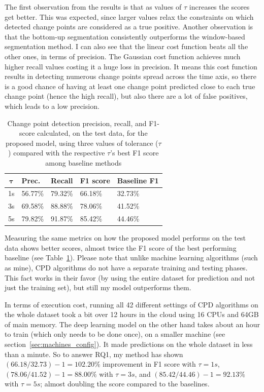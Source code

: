 The first observation from the results is that as values of $\tau$ increases the scores get better. This was expected, since larger values relax the constraints on which detected change points are considered as a true positive. Another observation is that the bottom-up segmentation consistently outperforms the window-based segmentation method. I can also see that the linear cost function beats all the other ones, in terms of precision. The Gaussian cost function achieves much higher recall values costing it a huge loss in precision. It means this cost function results in detecting numerous change points spread across the time axis, so there is a good chance of having at least one change point predicted close to each true change point (hence the high recall), but also there are a lot of false positives, which leads to a low precision. 

\begin{table}
\caption{Change point detection precision, recall, and F1-score calculated, on the test data, for the proposed model, using three values of tolerance ($\tau$) compared with the respective $\tau$'s best F1 score among baseline methods}
\label{tab:rq1-2-results}
\begin{tabularx}{\columnwidth}{cXXXX}
\toprule
  $\mathbf{\tau}$ &
  \textbf{Prec.} &
  \textbf{Recall} &
  \textbf{F1 score} & 
  \textbf{Baseline F1}  \\ \midrule
1s & 56.77\% &	79.32\% &	66.18\% & 32.73\% \\
3s & 69.58\% &	88.88\% &	78.06\% & 41.52\% \\
5s & 79.82\% &	91.87\%	&   85.42\% & 44.46\% \\\bottomrule
\end{tabularx}
\end{table}

Measuring the same metrics on how the proposed model performs on the test data shows better scores, almost twice the F1 score of the best performing baseline (see Table~\ref{tab:rq1-2-results}). 
Please note that unlike machine learning algorithms (such as mine), CPD algorithms do not have a separate training and testing phases. This fact works in their favor (by using the entire dataset for prediction and not just the training set), but still my model outperforms them.

In terms of execution cost, running all 42 different settings of CPD algorithms on the whole dataset took a bit over 12 hours in the cloud using 16 CPUs and 64GB of main memory. The deep learning model on the other hand takes about an hour to train (which only needs to be done once), on a smaller machine (see section~\ref{sec:machines_config}). It made predictions on the whole dataset in less than a minute.
So to answer RQ1, my method has shown $(66.18/32.73)-1=102.20\%$ improvement in F1 score with $\tau=1s$, $(78.06/41.52)-1=88.00\%$ with $\tau=3s$, and $(85.42/44.46)-1=92.13\%$ with $\tau=5s$; almost doubling the score compared to the baselines. 

